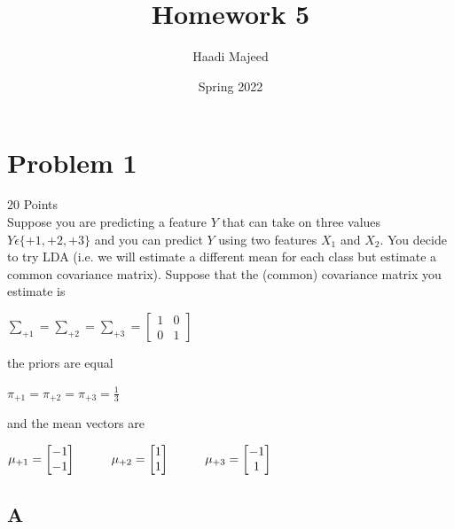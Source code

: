 \documentclass[12pt]{article}
\title{ \course \\\large Homework 5 }
\author{ Haadi Majeed }
\date{Spring 2022}
\newcommand\tab[1][1cm]{\hspace*{#1}}
\begin{document}
\maketitle
\pagebreak

\pagebreak
\section{Problem 1}
20 Points\\
Suppose you are predicting a feature $Y$ that can take on three values $Y \epsilon \{+1, +2, +3\}$ and you can predict $Y$ using two features $X_1$ and $X_2$. You decide to try LDA (i.e. we will estimate a different mean for each class but estimate a common covariance matrix). Suppose that the (common) covariance matrix you estimate is
\begin{center}
    $\sum_{+1} = \sum_{+2} = \sum_{+3} = \begin{bmatrix} 1 &0\\0 & 1\end{bmatrix}$
\end{center}
the priors are equal
\begin{center}
    $\pi_{+1} = \pi_{+2} = \pi_{+3} = \frac{1}{3}$
\end{center}
and the mean vectors are
\begin{center}
    $\mu_{+1} = \begin{bmatrix} -1\\-1\end{bmatrix}\tab\mu_{+2} = \begin{bmatrix} 1\\1\end{bmatrix}\tab\mu_{+3} = \begin{bmatrix} -1\\1\end{bmatrix}$
\end{center}

\subsection{A}
\end{document}
